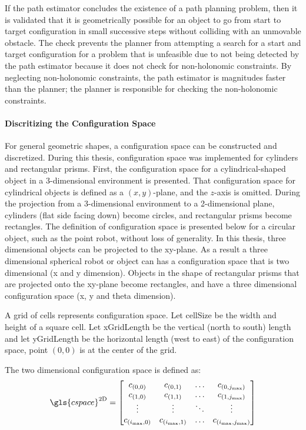 If the path estimator concludes the existence of a path planning problem, then it is validated that it is geometrically possible for an object to go from start to target configuration in small successive steps without colliding with an unmovable obstacle. The check prevents the planner from attempting a search for a start and target configuration for a problem that is unfeasible due to not being detected by the path estimator because it does not check for non-holonomic constraints. By neglecting non-holonomic constraints, the path estimator is magnitudes faster than the planner; the planner is responsible for checking the non-holonomic constraints.

\paragraph{Discritizing the Configuration Space}
For general geometric shapes, a configuration space can be constructed and discretized. During this thesis, configuration space was implemented for cylinders and rectangular prisms. First, the configuration space for a cylindrical-shaped object in a 3-dimensional environment is presented. That configuration space for cylindrical objects is defined as a $(x, y)$-plane, and the $z$-axis is omitted. During the projection from a 3-dimensional environment to a 2-dimensional plane, cylinders (flat side facing down) become circles, and rectangular prisms become rectangles. The definition of configuration space is presented below for a circular object, such as the point robot, without loss of generality. In this thesis, three dimensional objects can be projected to the xy-plane. As a result a three dimensional spherical robot or object can has a configuration space that is two dimensional (\gls{x} and \gls{y} dimension). Objects in the shape of rectangular prisms that are projected onto the xy-plane become rectangles, and have a three dimensional configuration space (\gls{x}, \gls{y} and \gls{theta} dimension).\bs
\bs

A grid of cells represents configuration space. Let \gls{cellSize} be the width and height of a square cell. Let \gls{xGridLength} be the vertical (north to south) length and let \gls{yGridLength} be the horizontal length (west to east) of the configuration space, point $(0, 0)$ is at the center of the grid.\bs

The two dimensional configuration space is defined as:\bs
\[ \gls{cspace}^{\textrm{2D}} =
\begin{bmatrix}
  c_{(0,0)} & c_{(0,1)} & \hdots & c_{(0,j_{\textrm{max}})}\\
  c_{(1,0)} & c_{(1,1)} & \hdots & c_{(1,j_{\textrm{max}})}\\
  \vdots &  \vdots & \ddots & \vdots\\
  c_{(i_{\textrm{max}},0)} & c_{(i_{\textrm{max}},1)} & \hdots & c_{(i_{\textrm{max}},j_{\textrm{max}})}\\
\end{bmatrix}
\]



